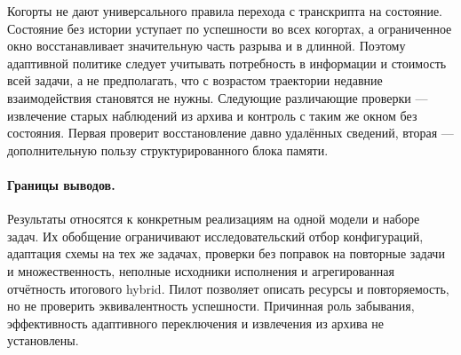 Когорты не дают универсального правила перехода с транскрипта на состояние. Состояние без истории уступает по успешности во всех когортах, а ограниченное окно восстанавливает значительную часть разрыва и в длинной. Поэтому адаптивной политике следует учитывать потребность в информации и стоимость всей задачи, а не предполагать, что с возрастом траектории недавние взаимодействия становятся не нужны. Следующие различающие проверки --- извлечение старых наблюдений из архива и контроль с таким же окном без состояния. Первая проверит восстановление давно удалённых сведений, вторая --- дополнительную пользу структурированного блока памяти.

\paragraph{Границы выводов.}
Результаты относятся к конкретным реализациям на одной модели и наборе задач. Их обобщение ограничивают исследовательский отбор конфигураций, адаптация схемы на тех же задачах, проверки без поправок на повторные задачи и множественность, неполные исходники исполнения и агрегированная отчётность итогового hybrid. Пилот позволяет описать ресурсы и повторяемость, но не проверить эквивалентность успешности. Причинная роль забывания, эффективность адаптивного переключения и извлечения из архива не установлены.
